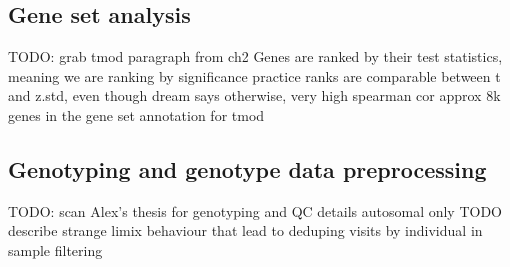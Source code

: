 \begin{outline}
\subsection{Gene set analysis}

\1 TODO: grab tmod paragraph from ch2
    \2 Genes are ranked by their test statistics, meaning we are ranking by significance
        \3 practice ranks are comparable between t and z.std, even though dream says otherwise, very high spearman cor
    \2 approx 8k genes in the gene set annotation for tmod


\subsection{Genotyping and genotype data preprocessing}

%
%
%
%

\1 TODO: scan Alex's thesis for genotyping and QC details
    \2 autosomal only
    \2 TODO describe strange limix behaviour that lead to deduping visits by individual in sample filtering


\end{outline}
